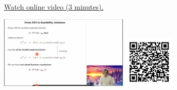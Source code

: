 
\begin{minipage}{10cm}
    \href{https://act4e-spring21.netlify.app/videos/spring2021-profunctors:from-dpi-to-feas.html}{Watch online video (3 minutes).}
        
    \href{https://act4e-spring21.netlify.app/videos/spring2021-profunctors:from-dpi-to-feas.html}{\includegraphics[height=3.5cm]{spring2021-profunctors:from-dpi-to-feas/thumbnails.jpg}}
    \href{https://act4e-spring21.netlify.app/videos/spring2021-profunctors:from-dpi-to-feas.html}{\includegraphics[height=2.5cm]{spring2021-profunctors:from-dpi-to-feas/qrcode.png}}
\end{minipage}
